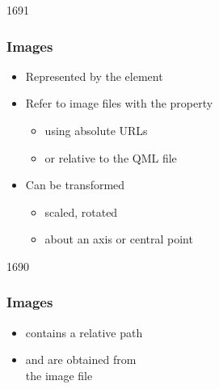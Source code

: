 
\begin{slide}{1691}\frametitle{Images}

\begin{itemize}
\item Represented by the  element
\item Refer to image files with the  property
  \begin{itemize}
  \item using absolute URLs
  \item or relative to the QML file
  \end{itemize}
\item Can be transformed
  \begin{itemize}
  \item scaled, rotated
  \item about an axis or central point
  \end{itemize}
\end{itemize}


\end{slide}


\begin{slide}{1690}\frametitle{Images}


\begin{itemize}
\item {} contains a relative path
\item {} and  are obtained from\\
the image file
\end{itemize}

\end{slide}


